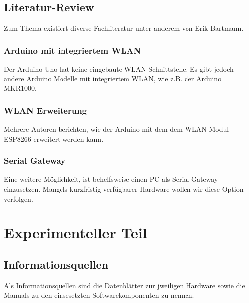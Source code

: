 \hypertarget{literatur-review}{%
\subsection{Literatur-Review}\label{literatur-review}}

Zum Thema existiert diverse Fachliteratur unter anderem von Erik
Bartmann\autocite{bartmannArduino}\autocite{bartmannESP8266}\autocite{bartmannESP32}.

\hypertarget{arduino-mit-integriertem-wlan}{%
\subsubsection{Arduino mit integriertem
WLAN}\label{arduino-mit-integriertem-wlan}}

Der Arduino Uno hat keine eingebaute WLAN Schnittstelle. Es gibt jedoch
andere Arduino Modelle mit integriertem WLAN, wie z.B. der Arduino
MKR1000.

\hypertarget{wlan-erweiterung}{%
\subsubsection{WLAN Erweiterung}\label{wlan-erweiterung}}

Mehrere Autoren
berichten\autocite{temperatureDashboard}\autocite{websocketcommunication},
wie der Arduino mit dem dem WLAN Modul ESP8266 erweitert werden kann.

\hypertarget{serial-gateway}{%
\subsubsection{Serial Gateway}\label{serial-gateway}}

Eine weitere Möglichkeit, ist behelfsweise einen PC als Serial Gateway
einzusetzen. Mangels kurzfristig verfügbarer Hardware wollen wir diese
Option verfolgen.

\hypertarget{experimenteller-teil}{%
\section{Experimenteller Teil}\label{experimenteller-teil}}

\hypertarget{informationsquellen}{%
\subsection{Informationsquellen}\label{informationsquellen}}

Als Informationsquellen sind die Datenblätter zur jweiligen Hardware
sowie die Manuals zu den einsesetzten Softwarekomponenten zu nennen.

